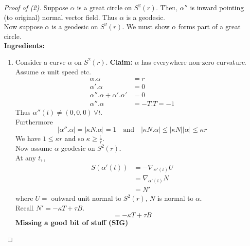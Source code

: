 \documentclass{article}
\newcommand{\abs}[1]{\left|#1\right|}
\theoremstyle{definition}
\theoremstyle{remark}
\theoremstyle{example}
\begin{document}
	\begin{proof}[Proof of (2)]
		Suppose $\alpha$ is a great circle on $S^2(r)$. Then, $\alpha''$ is inward pointing (to original) normal vector field. Thus $\alpha$ is a geodesic.\\
		Now suppose $\alpha$ is a geodesic on $S^2(r)$. We must show $\alpha$ forms part of a great circle.\\
		\textbf{Ingredients:}
		\begin{enumerate}
			\item Consider a curve $\alpha$ on $S^2(r)$.
			\textbf{Claim:} $\alpha$ has everywhere non-zero curvature.\\
			Assume $\alpha$ unit speed etc.\\
			\begin{align*}
				\alpha.\alpha&=r\\
				\alpha'.\alpha&=0\\
				\alpha''.\alpha+\alpha'.\alpha'&=0\\
				\alpha''.\alpha&=-T.T=-1
			\end{align*}
			Thus $\alpha''(t) \neq (0,0,0)\ \forall t$.\\
			Furthermore \[ \abs{\alpha''.\alpha} = \abs{\kappa N.\alpha} = 1 \quad \mathrm{and} \quad \abs{\kappa N.\alpha} \leq \abs{\kappa N} \abs{\alpha} \leq \kappa r \]
			We have $1 \leq \kappa r$ and so $\kappa \geq \frac{1}{r}$.\\
			Now assume $\alpha$ geodesic on $S^2(r)$.\\
			At any $t,$, \begin{align*}
				S(\alpha'(t))&=-\nabla_{\alpha'(t)}U\\
				&=\nabla_{\alpha'(t)}N\\
				&=N'
			\end{align*} where $U=$ outward unit normal to $S^2(r)$, $N$ is normal to $\alpha$.\\
			Recall $N'=-\kappa T + \tau B$.\\
			\[=-\kappa T+\tau B \]
			\textbf{Missing a good bit of stuff (SIG)}
			
			
				
			
		\end{enumerate}
	\end{proof}
\end{document}
